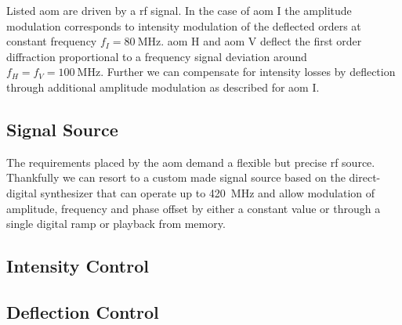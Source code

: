 Listed \gls*{aom} are driven by a \gls*{rf} signal. In the case of \gls*{aom} I
the amplitude modulation corresponds to intensity modulation of the deflected
orders at constant frequency $f_I=\SI{80}{\mega\hertz}$. \gls*{aom} H
and \gls*{aom} V deflect the first order diffraction proportional to
a frequency signal deviation around $f_H=f_V=\SI{100}{\mega\hertz}$. Further
we can compensate for intensity losses by deflection through additional
amplitude modulation as described for \gls*{aom} I.

\subsection{Signal Source}

The requirements placed by the \gls{aom} demand a flexible but precise
\gls{rf} source. Thankfully we can resort to a custom made signal source
based on the \cite{AD9910} direct-digital synthesizer that can operate up to
\SI{420}{\mega\hertz} and allow modulation of amplitude, frequency and phase
offset by either a constant value or through a single digital ramp or playback
from memory.

\subsection{Intensity Control}


\subsection{Deflection Control}
